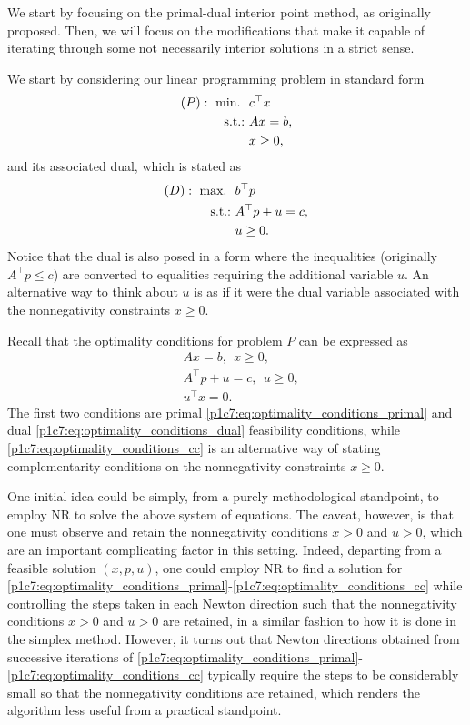 We start by focusing on the primal-dual interior point method, as originally proposed. Then, we will focus on the modifications that make it capable of iterating through some not necessarily interior solutions in a strict sense. 	

We start by considering our linear programming problem in standard form 
	\begin{align*}
		(P) :~ \mathop{\text{min.~}} \ &c^\top x \\
		\mathop{\text{s.t.:~}} &Ax = b,  \\
		&x \ge 0, 
	\end{align*}
	and its associated dual, which is stated as
	\begin{align*}
		(D) :~ \mathop{\text{max.~}} \ &b^\top p \\
		\mathop{\text{s.t.:~}} &A^\top p + u = c, \\
		&u \ge 0. 
	\end{align*}
	Notice that the dual is also posed in a form where the inequalities (originally $A^\top p \le c$) are converted to equalities requiring the additional variable $u$. An alternative way to think about $u$ is as if it were the dual variable associated with the nonnegativity constraints $x \ge 0$. 
	
Recall that the optimality conditions for problem $P$ can be expressed as
	\begin{align} 
		& Ax = b, \ \ x \ge 0, \label{p1c7:eq:optimality_conditions_primal} \\
		& A^\top p + u = c, \ \ u \ge 0, \label{p1c7:eq:optimality_conditions_dual} \\
		& u^\top x = 0. \label{p1c7:eq:optimality_conditions_cc}  
	\end{align}
	The first two conditions are primal \eqref{p1c7:eq:optimality_conditions_primal} and dual \eqref{p1c7:eq:optimality_conditions_dual} feasibility conditions, while \eqref{p1c7:eq:optimality_conditions_cc} is an alternative way of stating complementarity conditions on the nonnegativity constraints $x \ge 0$.
	
One initial idea could be simply, from a purely methodological standpoint, to employ NR to solve the above system of equations. The caveat, however, is that one must observe and retain the nonnegativity conditions $x > 0$ and $u >0$, which are an important complicating factor in this setting. Indeed, departing from a feasible solution $(x,p,u)$, one could employ NR to find a solution for \eqref{p1c7:eq:optimality_conditions_primal}-\eqref{p1c7:eq:optimality_conditions_cc} while controlling the steps taken in each Newton direction such that the nonnegativity conditions $x > 0$ and $u >0$ are retained, in a similar fashion to how it is done in the simplex method. However, it turns out that Newton directions obtained from successive iterations of \eqref{p1c7:eq:optimality_conditions_primal}- \eqref{p1c7:eq:optimality_conditions_cc} typically require the steps to be considerably small so that the nonnegativity conditions are retained, which renders the algorithm less useful from a practical standpoint.
	   

